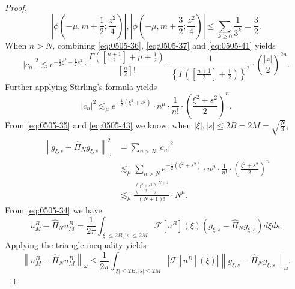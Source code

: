 \documentclass[pdflatex,sn-aps]{sn-jnl}%
\theoremstyle{thmstyleone}%
\theoremstyle{thmstyletwo}%
\theoremstyle{thmstylethree}%
\begin{document}
\begin{proof}
\begin{equation}
    \left|\phi\left(-\mu, m+\frac{1}{2} ; \frac{z^2}{4}\right)\right|,\left|\phi\left(-\mu, m+\frac{3}{2} ; \frac{z^2}{4}\right)\right| \leqslant \sum_{k\geqslant 0} \frac{1}{3^k} = \frac{3}{2}.
  \end{equation}
  When $n>N$, combining \eqref{eq:0505-36}, \eqref{eq:0505-37} and
  \eqref{eq:0505-41} yields
  \begin{equation}\label{eq:0505-42}
    \left|c_n\right|^2 \lesssim e^{-\frac{1}{2} \xi^2-\frac{1}{2} s^2} \cdot \frac{\Gamma\left(\left[\frac{n+1}{2}\right]+\mu+\frac{1}{2}\right)}{\left[\frac{n}{2}\right]!} \cdot \frac{1}{\left\{\Gamma\left(\left[\frac{n+1}{2}\right]+\frac{1}{2}\right)\right\}^2} \cdot \left(\frac{|z|}{2}\right)^{2 n}.
  \end{equation}
  Further applying Stirling's formula yields
  \begin{equation}\label{eq:0505-43}
    \left|c_n\right|^2 \lesssim_\mu e^{-\frac{1}{2}\left(\xi^2+s^2\right)} \cdot n^\mu \cdot \frac{1}{n!} \cdot\left(\frac{\xi^2+s^2}{2}\right)^n.
  \end{equation}
  From \eqref{eq:0505-35} and \eqref{eq:0505-43} we know: when $|\xi|,|s| \leqslant 2 B=2 M=\sqrt{\frac{N}{3}}$,
  \begin{equation}\label{eq:0505-44}
    \begin{aligned}
    \left\|g_{\xi, s}-\widehat{\Pi}_N g_{\xi, s}\right\|_\omega^2 & =\sum_{n>N}\left|c_n\right|^2 \\
    & \lesssim_\mu \sum_{n>N} e^{-\frac{1}{2}\left(\xi^2+s^2\right)} \cdot n^\mu \cdot \frac{1}{n!} \cdot\left(\frac{\xi^2+s^2}{2}\right)^n \\
    & \lesssim_\mu \frac{\left(\frac{\xi^2+s^2}{2}\right)^{N+1}}{(N+1)!} \cdot N^\mu.
    \end{aligned}
  \end{equation}
  From \eqref{eq:0505-34} we have
  \begin{equation}\label{eq:0505-45}
    u_M^B-\widehat{\Pi}_N u_M^B=\frac{1}{2 \pi} \int_{|\xi| \leqslant 2 B,|s| \leqslant 2 M} \mathcal{F}\left[u^B\right](\xi)\left(g_{\xi, s}-\widehat{\Pi}_N g_{\xi, s}\right) d \xi d s.
  \end{equation}
  Applying the triangle inequality yields
  \begin{equation}\label{eq:0505-46}
    \left\|u_M^B-\widehat{\Pi}_N u_M^B\right\|_\omega \leqslant \frac{1}{2 \pi} \int_{|\xi| \leqslant 2 B,|s| \leqslant 2 M}\left|\mathcal{F} \left[ u^B \right](\xi)\right|\left\|g_{\xi, s}-\widehat{\Pi}_N g_{\xi,s}\right\|_\omega.
  \end{equation}

\end{proof}
\end{document}
